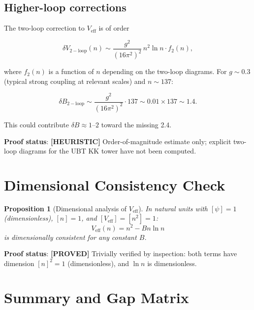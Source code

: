 \documentclass[11pt,a4paper]{article}
\newtheorem{proposition}{Proposition}
\newcommand{\proved}[1]{\textbf{[PROVED]} #1}
\newcommand{\heuristic}[1]{\textbf{[HEURISTIC]} #1}
\begin{document}
\subsection{Higher-loop corrections}

The two-loop correction to $V_\mathrm{eff}$ is of order

\[
  \delta V_\mathrm{2-loop}(n)
  \sim \frac{g^2}{(16\pi^2)^2}\, n^2 \ln n \cdot f_2(n),
\]

where $f_2(n)$ is a function of $n$ depending on the two-loop diagrams.
For $g \sim 0.3$ (typical strong coupling at relevant scales) and $n \sim 137$:

\[
  \delta B_\mathrm{2-loop} \sim \frac{g^2}{(16\pi^2)^2}\cdot 137
  \sim 0.01 \times 137 \sim 1.4.
\]

This could contribute $\delta B \approx 1$--$2$ toward the missing 2.4.

\textbf{Proof status}: \heuristic{Order-of-magnitude estimate only; explicit
two-loop diagrams for the UBT KK tower have not been computed.}

\section{Dimensional Consistency Check}

\begin{proposition}[Dimensional analysis of $V_\mathrm{eff}$]
  In natural units with $[\psi] = 1$ (dimensionless), $[n] = 1$, and
  $[V_\mathrm{eff}] = [n^2] = 1$:
  \[
    V_\mathrm{eff}(n) = n^2 - Bn\ln n
  \]
  is dimensionally consistent for any constant $B$.
\end{proposition}

\textbf{Proof status}: \proved{Trivially verified by inspection: both terms
have dimension $[n]^2 = 1$ (dimensionless), and $\ln n$ is dimensionless.}

\section{Summary and Gap Matrix}
\end{document}
